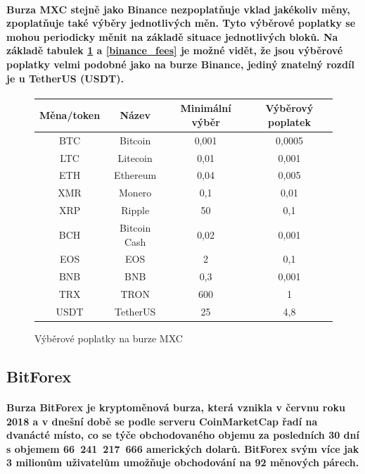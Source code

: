 \documentclass[thesis=B,czech]{FITthesis}[2019/03/21]
\begin{document}
\paragraph{
Burza MXC stejně jako Binance nezpoplatňuje vklad jakékoliv měny, zpoplatňuje také výběry jednotlivých měn. Tyto výběrové poplatky se mohou periodicky měnit na základě situace jednotlivých bloků. \cite{mxc_fees} Na základě tabulek \ref{mxc_fees} a \ref{binance_fees} je možné vidět, že jsou výběrové poplatky velmi podobné jako na burze Binance, jediný znatelný rozdíl je u TetherUS (USDT). \cite{cryptowisser_mxc}
}
\begin{figure}\centering
    \begin{center}
     \begin{tabular}{||c | c | c | c||} 
     \hline
     Měna/token & Název & Minimální výběr & Výběrový poplatek \\ [0.5ex] 
     \hline\hline
     BTC & Bitcoin & 0,001 & 0,0005 \\ 
     \hline
     LTC & Litecoin & 0,01 & 0,001 \\
     \hline
     ETH & Ethereum & 0,04 & 0,005 \\
     \hline
     XMR & Monero & 0,1 & 0,01 \\
     \hline
     XRP & Ripple & 50 & 0,1 \\
     \hline
     BCH & Bitcoin Cash & 0,02 & 0,001 \\
     \hline
     EOS & EOS & 2 & 0,1 \\
     \hline
     BNB & BNB & 0,3 & 0,001 \\
     \hline
     TRX & TRON & 600 & 1 \\
     \hline
     USDT & TetherUS & 25 & 4,8 \\ [1ex] 
     \hline
    \end{tabular}
    \end{center}
    \caption{Výběrové poplatky na burze MXC \cite{mxc_fees}}
    \label{mxc_fees}
\end{figure}
\subsection{BitForex}
\paragraph{
Burza BitForex je kryptoměnová burza, která vznikla v červnu roku 2018 a v dnešní době se podle serveru CoinMarketCap řadí na dvanácté místo, co se týče obchodovaného objemu za posledních 30 dní s objemem 66~241~217~666 amerických dolarů. \cite{coinmarketcap} BitForex svým více jak 3 milionům uživatelům umožňuje obchodování na 92 měnových párech.  \cite{cryptowisser_bitforex}
}
\end{document}
